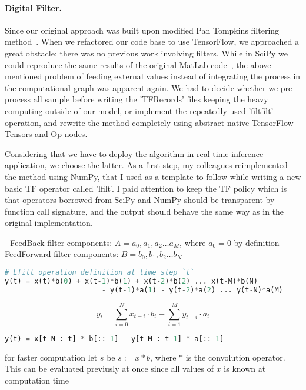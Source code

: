 \paragraph{Digital Filter.}
Since our original approach was built upon modified Pan Tompkins filtering method~\cite{pantompkins}.
When we refactored our code base to use TensorFlow, we approached a great obstacle: there was no previous work involving filters.
While in SciPy we could reproduce the same results of the original MatLab code~\cite{the-original-matlab-code}, the above mentioned problem of feeding external values instead of integrating the process in the computational graph was apparent again.
We had to decide whether we pre-process all sample before writing the 'TFRecords' files keeping the heavy computing outside of our model, or implement the repeatedly used 'filtfilt' operation, and rewrite the method completely using abstract native TensorFlow Tensors and Op nodes.

Considering that we have to deploy the algorithm in real time inference application, we choose the latter.
As a first step, my colleagues reimplemented the method using NumPy, that I used as a template to follow while writing a new basic TF operator called 'lfilt'.
I paid attention to keep the TF policy which is that operators borrowed from SciPy and NumPy should be transparent by function call signature, and the output should behave the same way as in the original implementation.


- FeedBack filter components:   $A = a_0, a_1, a_2 \dots a_M$, where $a_0 = 0$ by definition
- FeedForward filter components:   $B = b_0, b_1, b_2 \dots b_N$

\begin{lstlisting}[language=Python]
# Lfilt operation definition at time step `t`
y(t) = x(t)*b(0) + x(t-1)*b(1) + x(t-2)*b(2) ... x(t-M)*b(N)
                       - y(t-1)*a(1) - y(t-2)*a(2) ... y(t-N)*a(M)
\end{lstlisting}

$$
y_t = \sum_{i=0}^{N} x_{t-i} \cdot b_{i} - \sum_{i=1}^{M} y_{t-i} \cdot a_{i}
$$


\begin{lstlisting}[language=Python]
y(t) = x[t-N : t] * b[::-1] - y[t-M : t-1] * a[::-1]
\end{lstlisting}


for faster computation let $s$ be $s := x \ast b$, where $\ast$ is the convolution operator. This can be evaluated previusly at once since all values of $x$ is known at computation time

